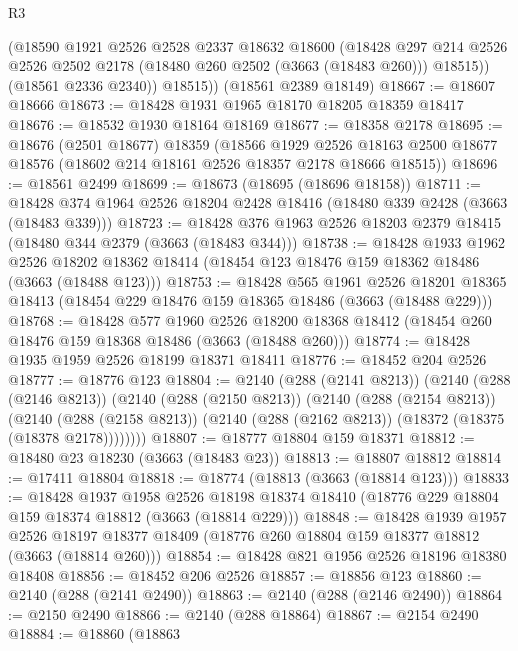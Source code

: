 \begin{lexlean}{R3}
\begin{coremodule}
          (@18590
            @1921
            @2526
            @2528
            @2337
            @18632
            @18600
            (@18428
              @297
              @214
              @2526
              @2526
              @2502
              @2178
              (@18480 @260 @2502 (@3663 (@18483 @260)))
              @18515))
          (@18561 @2336 @2340))
        @18515))
    (@18561 @2389 @18149)
@18667 := @18607 @18666
@18673 := @18428 @1931 @1965 @18170 @18205 @18359 @18417
@18676 := @18532 @1930 @18164 @18169
@18677 := @18358 @2178
@18695 := @18676
    (@2501 @18677)
    @18359
    (@18566
      @1929
      @2526
      @18163
      @2500
      @18677
      @18576
      (@18602 @214 @18161 @2526 @18357 @2178 @18666 @18515))
@18696 := @18561 @2499
@18699 := @18673 (@18695 (@18696 @18158))
@18711 := @18428 @374 @1964 @2526 @18204 @2428 @18416 (@18480 @339 @2428 (@3663 (@18483 @339)))
@18723 := @18428 @376 @1963 @2526 @18203 @2379 @18415 (@18480 @344 @2379 (@3663 (@18483 @344)))
@18738 := @18428
    @1933
    @1962
    @2526
    @18202
    @18362
    @18414
    (@18454 @123 @18476 @159 @18362 @18486 (@3663 (@18488 @123)))
@18753 := @18428
    @565
    @1961
    @2526
    @18201
    @18365
    @18413
    (@18454 @229 @18476 @159 @18365 @18486 (@3663 (@18488 @229)))
@18768 := @18428
    @577
    @1960
    @2526
    @18200
    @18368
    @18412
    (@18454 @260 @18476 @159 @18368 @18486 (@3663 (@18488 @260)))
@18774 := @18428 @1935 @1959 @2526 @18199 @18371 @18411
@18776 := @18452 @204 @2526
@18777 := @18776 @123
@18804 := @2140
    (@288 (@2141 @8213))
    (@2140
      (@288 (@2146 @8213))
      (@2140
        (@288 (@2150 @8213))
        (@2140
          (@288 (@2154 @8213))
          (@2140
            (@288 (@2158 @8213))
            (@2140 (@288 (@2162 @8213)) (@18372 (@18375 (@18378 @2178))))))))
@18807 := @18777 @18804 @159 @18371
@18812 := @18480 @23 @18230 (@3663 (@18483 @23))
@18813 := @18807 @18812
@18814 := @17411 @18804
@18818 := @18774 (@18813 (@3663 (@18814 @123)))
@18833 := @18428
    @1937
    @1958
    @2526
    @18198
    @18374
    @18410
    (@18776 @229 @18804 @159 @18374 @18812 (@3663 (@18814 @229)))
@18848 := @18428
    @1939
    @1957
    @2526
    @18197
    @18377
    @18409
    (@18776 @260 @18804 @159 @18377 @18812 (@3663 (@18814 @260)))
@18854 := @18428 @821 @1956 @2526 @18196 @18380 @18408
@18856 := @18452 @206 @2526
@18857 := @18856 @123
@18860 := @2140 (@288 (@2141 @2490))
@18863 := @2140 (@288 (@2146 @2490))
@18864 := @2150 @2490
@18866 := @2140 (@288 @18864)
@18867 := @2154 @2490
@18884 := @18860
    (@18863

\end{coremodule}
\end{lexlean}
